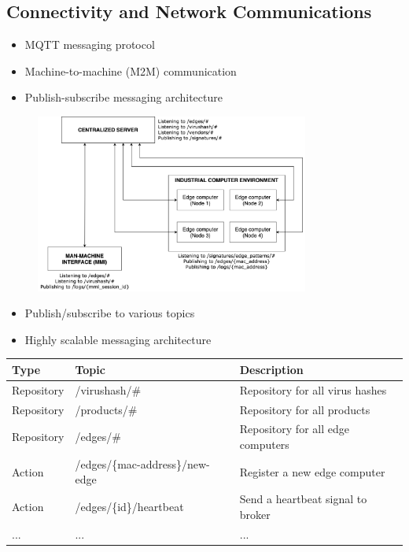 \subsection{Connectivity and Network Communications}
\begin{frame}{\insertsubsection}
    \begin{itemize}
        \item MQTT messaging protocol
        \item Machine-to-machine (M2M) communication
        \item Publish-subscribe messaging architecture
    \end{itemize}
    
    \begin{figure}[h]
        \centering
        \includegraphics[width=9cm]{img/mqtt_diagram.png}
        \label{fig:mqtt_diagram}
    \end{figure}
\end{frame}

\begin{frame}{\insertsubsection}
    \begin{itemize}
        \item Publish/subscribe to various topics
        \item Highly scalable messaging architecture
    \end{itemize}
    
    \vspace{0.5cm}
    \begin{center}
        \begin{tabular}{ | l | l | p{6cm} |}
        \hline
        \textbf{Type} & \textbf{Topic} & \textbf{Description} \\ \hline
        Repository & /virushash/\# & Repository for all virus hashes \\ \hline
        Repository & /products/\# & Repository for all products \\ \hline
        Repository & /edges/\# & Repository for all edge computers \\ \hline
        Action & /edges/\{mac-address\}/new-edge & Register a new edge computer \\ \hline
        Action & /edges/\{id\}/heartbeat & Send a heartbeat signal to broker \\ \hline
        ... & ... & ... \\ \hline
        \end{tabular}
    \end{center}
\end{frame}

